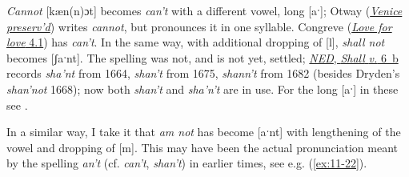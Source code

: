\textit{Cannot} [kæn(n)ɔt] becomes \textit{can't} with a different vowel, long [aˑ]; Otway (\href{https://archive.org/details/venicepreservdor00otwa/page/68/mode/2up?q=%22cannot%22&view=theater}{\textit{Venice preserv'd}}) writes \textit{cannot}, but pronounces it in one syllable. Congreve (\href{https://archive.org/details/in.ernet.dli.2015.219151/page/n207/mode/2up?q=%22can%27t%22&view=theater}{\textit{Love for love} 4.1}) has \textit{can't}. In the same way, with additional dropping of [l], \textit{shall not} becomes [ʃaˑnt]. The spelling was not, and is not yet, settled; \href{https://archive.org/details/in.ernet.dli.2015.271834/page/n611/mode/2up?view=theater}{\textit{NED}, \textit{Shall} \textit{v.} 6~b} records \textit{sha'nt} from 1664, 
\textit{shan't} from 1675, \textit{shann't} from 1682 (besides Dryden's \textit{shan'not} 1668); now both 
\textit{shan't} and 
\textit{sha'n't} are in use. %
For the long [aˑ] in these see \citet[300 \href{https://archive.org/details/a-modern-english-grammar-on-historical-principles.-jespersen-otto-1860-1943-hais/page/300/mode/2up?q=sha\%27n\%27t&view=theater}{\S10.552}]{jespersenMEG1}.

\bigskip

In a similar way, I take it that \textit{am not} has become [aˑnt] with lengthening of the vowel and dropping of [m]. This may have been the actual pronunciation meant by the spelling \textit{an't} (cf. \textit{can't}, \textit{shan't}) in earlier times, see e.g. (\ref{ex:11-22}).

